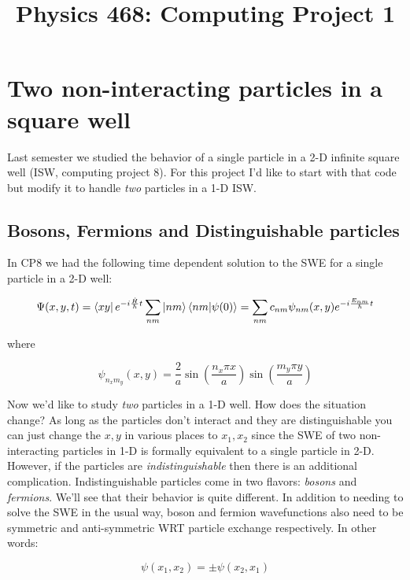 \documentclass[11pt]{article} %
\title{Physics 468: Computing Project 1}
\begin{document}
\maketitle

\section*{Two non-interacting particles in a square well}

Last semester we studied the behavior of a single particle in a 2-D infinite square well (ISW, computing project 8). For this project I'd like to start with that code but modify it to handle {\it two} particles in a 1-D ISW.

\subsection* {Bosons, Fermions and Distinguishable particles}

In CP8 we had the following time dependent solution to the SWE for a single particle in a 2-D well:

\begin{equation}
\Psi(x, y, t) = \bra{xy} e^{-i\frac{\hat{H}}{\hbar} t} \sum_{nm} \ket{nm}\braket{nm|\psi(0)} = \sum_{nm} c_{nm} \psi_{nm}(x,y) e^{-i\frac{E_{nm}}{\hbar} t}
\end{equation}

where

\begin{equation}
\psi_{n_xm_y}(x,y) = \frac{2}{a}\sin(\frac{n_x\pi x}{a})\sin(\frac{m_y\pi y}{a})
\label{eq:Solution-swe}
\end{equation}

Now we'd like to study {\it two} particles in a 1-D well. How does the situation change? As long as the particles don't interact and they are distinguishable you can just change the $x,y$ in various places to $x_1, x_2$ since the SWE of two non-interacting particles in 1-D is formally equivalent to a single particle in 2-D. However, if the particles are {\it indistinguishable} then there is an additional complication. Indistinguishable particles come in two flavors: {\it bosons} and {\it fermions}. We'll see that their behavior is quite different. In addition to needing to solve the SWE in the usual way, boson and fermion wavefunctions also need to be symmetric and anti-symmetric WRT particle exchange respectively. In other words:

\begin{equation}
\psi(x_1, x_2) = \pm \psi(x_2, x_1)
\end{equation}
\end{document}
